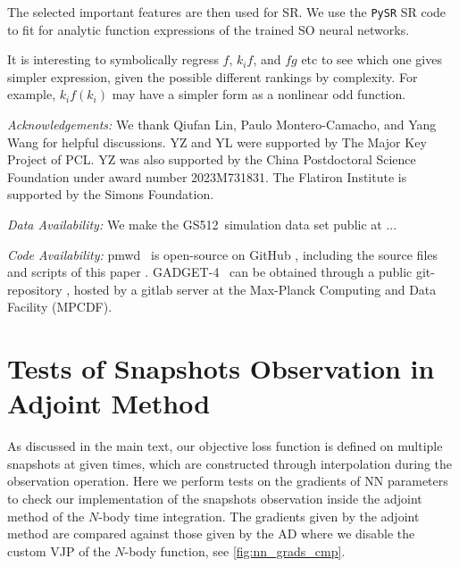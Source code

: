 \documentclass[modern, trackchanges, dvipsnames]{aastex631}
\newcommand{\pmwd}{{\usefont{T1}{nova}{m}{sl}pmwd}}
\newcommand{\GADGET}{{{\fontsize{10pt}{12pt}\selectfont GADGET}-4}}
\newcommand{\GSDATA}{{GS512}}
\newcommand{\YL}[1]{\textcolor{Bittersweet}{#1}}
\begin{document}
The selected important features are then used for SR.
We use the \texttt{PySR} \citep{PySR} SR code to fit for analytic
function expressions of the trained SO neural networks.

\YL{It is interesting to symbolically regress $f$, $k_i f$, and $f g$
etc to see which one gives simpler expression, given the possible
different rankings by complexity.
For example, $k_i f(k_i)$ may have a simpler form as a nonlinear odd
function.}


\vspace{1em}
\textit{\large Acknowledgements:}
We thank Qiufan Lin, Paulo Montero-Camacho, and Yang Wang for helpful
discussions.
YZ and YL were supported by The Major Key Project of PCL.
YZ was also supported by the China Postdoctoral Science Foundation under
award number 2023M731831.
The Flatiron Institute is supported by the Simons Foundation.


\vspace{1em}
\textit{\large Data Availability:}
We make the \GSDATA\ simulation data set public at ...


\vspace{1em}
\textit{\large Code Availability:}
\pmwd\ \citep{Li2022b} is open-source on GitHub
\href{https://github.com/eelregit/pmwd}{\faGithub}, including the source
files and scripts of this paper
\href{https://github.com/eelregit/pmwd/tree/master/docs/papers/sto}{\faFile}.
\GADGET\ \citep{GADGET-4} can be obtained through a public
git-repository \href{http://gitlab.mpcdf.mpg.de/vrs/gadget4}{\faGitlab},
hosted by a gitlab server at the Max-Planck Computing and Data Facility
(MPCDF).







\vspace{1em}
\appendix


\vspace{1em}
\section{Tests of Snapshots Observation in Adjoint Method}
As discussed in the main text, our objective loss function is defined on
multiple snapshots at given times, which are constructed through
interpolation during the observation operation.
Here we perform tests on the gradients of NN parameters to check our
implementation of the snapshots observation inside the adjoint method of
the $N$-body time integration.
The gradients given by the adjoint method are compared against those
given by the AD where we disable the custom VJP of the $N$-body
function, see
\autoref{fig:nn_grads_cmp}.
\end{document}
